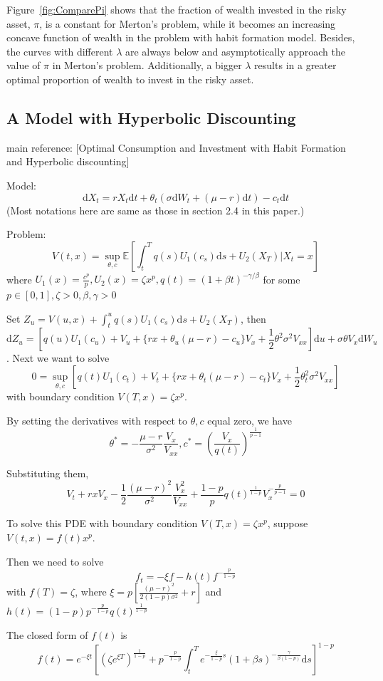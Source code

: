 \documentclass[a4paper]{article}
\theoremstyle{definition}
\numberwithin{equation}{section}
\begin{document}
Figure~\ref{fig:ComparePi} shows that the fraction of wealth invested in the risky asset, $\pi$, is a constant for Merton's problem, while it becomes an increasing concave function of wealth in the problem with habit formation model. Besides, the curves with different $\lambda$ are always below and asymptotically approach the value of $\pi$ in Merton's problem. Additionally, a bigger $\lambda$ results in a greater optimal proportion of wealth to invest in the risky asset.

\iffalse
\subsection{A Model with Hyperbolic Discounting}
main reference: [Optimal Consumption and Investment with Habit Formation and Hyperbolic discounting]

Model:
$$\mathrm dX_t=rX_t\mathrm dt+\theta_t(\sigma\mathrm dW_t+(\mu-r)\mathrm dt)-c_t\mathrm dt$$
(Most notations here are same as those in section 2.4 in this paper.)

Problem:
$$V(t,x)=\sup_{\theta,c}\mathbb E[\int^T_tq(s)U_1(c_s)\mathrm ds+U_2(X_T)\lvert X_t=x]$$
where $U_1(x)=\frac{c^p}{p}, U_2(x)=\zeta x^p, q(t)=(1+\beta t)^{-\gamma/\beta}$ for some $p\in[0,1],\zeta>0,\beta,\gamma>0$

Set $Z_u=V(u,x)+\int^u_tq(s)U_1(c_s)\mathrm ds+U_2(X_T)$,
then
$$\mathrm dZ_u=[q(u)U_1(c_u)+V_u+\{rx+\theta_u(\mu-r)-c_u\}V_x+\frac{1}{2}\theta^2\sigma^2V_{xx}]\mathrm du+\sigma\theta V_x\mathrm dW_u$$.
Next we want to solve
$$0=\sup_{\theta,c}[q(t)U_1(c_t)+V_t+\{rx+\theta_t(\mu-r)-c_t\}V_x+\frac{1}{2}\theta_t^2\sigma^2V_{xx}]$$
with boundary condition $V(T,x)=\zeta x^p$.

By setting the derivatives with respect to $\theta,c$ equal zero, we have 
$$\theta^*=-\frac{\mu-r}{\sigma^2}\frac{V_x}{V_{xx}}, c^*=\left(\frac{V_x}{q(t)}\right)^\frac{1}{p-1}$$

Substituting them,
$$V_t+rxV_x-\frac{1}{2}\frac{(\mu-r)^2}{\sigma^2}\frac{V_x^2}{V_{xx}}+\frac{1-p}{p}q(t)^\frac{1}{1-p}V_x^{-\frac{p}{p-1}}=0$$

To solve this PDE with boundary condition $V(T,x)=\zeta x^p$,
suppose $V(t,x)=f(t)x^p$.

Then we need to solve
$$f_t=-\xi f-h(t)f^{-\frac{p}{1-p}}$$
with $f(T)=\zeta$,
where $\xi=p[\frac{(\mu-r)^2}{2(1-p)\sigma^2}+r]$ and
$h(t)=(1-p)p^{-\frac{p}{1-p}}q(t)^\frac{1}{1-p}$

The closed form of $f(t)$ is
$$f(t)=e^{-\xi t}[(\zeta e^{\xi T})^\frac{1}{1-p}+p^{-\frac{p}{1-p}}\int^T_te^{-\frac{\xi}{1-p}s}(1+\beta s)^{-\frac{\gamma}{\beta(1-p)}}\mathrm ds]^{1-p}$$
\end{document}
